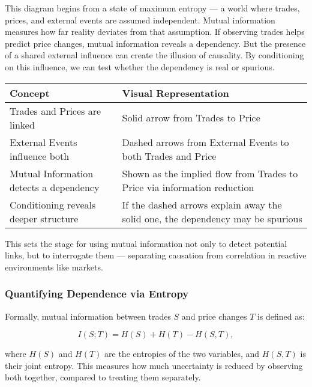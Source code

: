 \noindent
This diagram begins from a state of maximum entropy — a world where trades, prices, and external events are assumed independent. Mutual information measures how far reality deviates from that assumption. If observing trades helps predict price changes, mutual information reveals a dependency. But the presence of a shared external influence can create the illusion of causality. By conditioning on this influence, we can test whether the dependency is real or spurious.

\begin{center}
\renewcommand{\arraystretch}{1.4}
\begin{tabular}{|p{5.2cm}|p{7.4cm}|}
\hline
\textbf{Concept} & \textbf{Visual Representation} \\
\hline
Trades and Prices are linked & Solid arrow from Trades to Price \\
\hline
External Events influence both & Dashed arrows from External Events to both Trades and Price \\
\hline
Mutual Information detects a dependency & Shown as the implied flow from Trades to Price via information reduction \\
\hline
Conditioning reveals deeper structure & If the dashed arrows explain away the solid one, the dependency may be spurious \\
\hline
\end{tabular}
\end{center}

\vspace{1em}
\noindent
This sets the stage for using mutual information not only to detect potential links, but to interrogate them — separating causation from correlation in reactive environments like markets.


\subsubsection{Quantifying Dependence via Entropy}



\vspace{1em}
\noindent
Formally, mutual information between trades \( S \) and price changes \( T \) is defined as:

\[
I(S; T) = H(S) + H(T) - H(S, T),
\]

where \( H(S) \) and \( H(T) \) are the entropies of the two variables, and \( H(S, T) \) is their joint entropy. This measures how much uncertainty is reduced by observing both together, compared to treating them separately.

